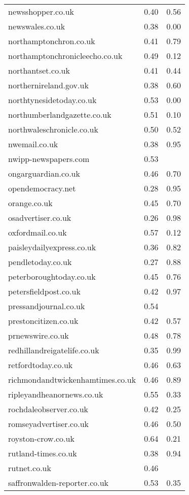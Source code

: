\begin{longtable}{p{}p{}p{}}
  newsshopper.co.uk & 0.40 & 0.56 \\ 
  newswales.co.uk & 0.38 & 0.00 \\ 
  northamptonchron.co.uk & 0.41 & 0.79 \\ 
  northamptonchronicleecho.co.uk & 0.49 & 0.12 \\ 
  northantset.co.uk & 0.41 & 0.44 \\ 
  northernireland.gov.uk & 0.38 & 0.60 \\ 
  northtynesidetoday.co.uk & 0.53 & 0.00 \\ 
  northumberlandgazette.co.uk & 0.51 & 0.10 \\ 
  northwaleschronicle.co.uk & 0.50 & 0.52 \\ 
  nwemail.co.uk & 0.38 & 0.95 \\ 
  nwipp-newspapers.com & 0.53 &  \\ 
  ongarguardian.co.uk & 0.46 & 0.70 \\ 
  opendemocracy.net & 0.28 & 0.95 \\ 
  orange.co.uk & 0.45 & 0.70 \\ 
  osadvertiser.co.uk & 0.26 & 0.98 \\ 
  oxfordmail.co.uk & 0.57 & 0.12 \\ 
  paisleydailyexpress.co.uk & 0.36 & 0.82 \\ 
  pendletoday.co.uk & 0.27 & 0.88 \\ 
  peterboroughtoday.co.uk & 0.45 & 0.76 \\ 
  petersfieldpost.co.uk & 0.42 & 0.97 \\ 
  pressandjournal.co.uk & 0.54 &  \\ 
  prestoncitizen.co.uk & 0.42 & 0.57 \\ 
  prnewswire.co.uk & 0.48 & 0.78 \\ 
  redhillandreigatelife.co.uk & 0.35 & 0.99 \\ 
  retfordtoday.co.uk & 0.46 & 0.63 \\ 
  richmondandtwickenhamtimes.co.uk & 0.46 & 0.89 \\ 
  ripleyandheanornews.co.uk & 0.55 & 0.33 \\ 
  rochdaleobserver.co.uk & 0.42 & 0.25 \\ 
  romseyadvertiser.co.uk & 0.46 & 0.50 \\ 
  royston-crow.co.uk & 0.64 & 0.21 \\ 
  rutland-times.co.uk & 0.38 & 0.94 \\ 
  rutnet.co.uk & 0.46 &  \\ 
  saffronwalden-reporter.co.uk & 0.53 & 0.35 \\ 

\end{longtable}
